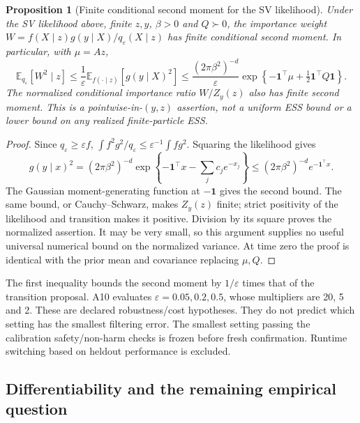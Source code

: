 \documentclass[11pt]{article}
\newtheorem{proposition}{Proposition}
\begin{document}
\begin{proposition}[Finite conditional second moment for the SV likelihood]
\label{prop:robust-second-moment}
Under the SV likelihood above, finite $z,y$, $\beta>0$ and $Q\succ0$,
the importance weight $W=f(X\mid z)g(y\mid X)/q_\varepsilon(X\mid z)$
has finite conditional second moment. In particular, with $\mu=Az$,
\begin{equation}
 \mathbb E_{q_\varepsilon}[W^2\mid z]
 \le \frac{1}{\varepsilon}\mathbb E_{f(\cdot\mid z)}[g(y\mid X)^2]
 \le \frac{(2\pi\beta^2)^{-d}}{\varepsilon}
 \exp\!\left\{-\boldsymbol1^\top\mu
                  +\tfrac12\boldsymbol1^\top Q\boldsymbol1\right\}.
 \label{eq:robust-second-moment}
\end{equation}
The normalized conditional importance ratio $W/Z_y(z)$ also has finite
second moment. This is a pointwise-in-$(y,z)$ assertion, not a uniform ESS
bound or a lower bound on any realized finite-particle ESS.
\end{proposition}
\begin{proof}
Since $q_\varepsilon\ge\varepsilon f$,
$\int f^2g^2/q_\varepsilon\le\varepsilon^{-1}\int fg^2$.
Squaring the likelihood gives
\[
 g(y\mid x)^2=(2\pi\beta^2)^{-d}
 \exp\!\left\{-\boldsymbol1^\top x-\sum_j c_j e^{-x_j}\right\}
 \le (2\pi\beta^2)^{-d}e^{-\boldsymbol1^\top x}.
\]
The Gaussian moment-generating function at $-\boldsymbol1$ gives the
second bound. The same bound, or Cauchy--Schwarz, makes $Z_y(z)$ finite;
strict positivity of the likelihood and transition makes it positive.
Division by its square proves the normalized assertion. It may be very
small, so this argument supplies no useful universal numerical bound on
the normalized variance. At time zero the proof is identical with the
prior mean and covariance replacing $\mu,Q$.
\end{proof}

The first inequality bounds the second moment by $1/\varepsilon$ times
that of the transition proposal. A10 evaluates $\varepsilon=0.05,0.2,0.5$,
whose multipliers are 20, 5 and 2. These are declared robustness/cost
hypotheses. They do not predict which setting has the smallest filtering
error. The smallest setting passing the calibration safety/non-harm checks
is frozen before fresh confirmation. Runtime switching based on heldout
performance is excluded.

\subsection{Differentiability and the remaining empirical question}
\end{document}
